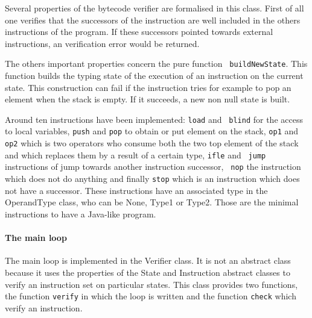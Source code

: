 Several properties of the bytecode verifier are formalised in this class.
First of all one verifies that the successors of the instruction are well included in the others instructions of the program. 
If these successors pointed towards external instructions, an verification error would be returned. 

The others important properties concern the pure function {\tt
buildNewState}.  This function builds the typing state of the
execution of an instruction on the current state.  This construction
can fail if the instruction tries for example to pop an element when
the stack is empty.  If it succeeds, a new non null state is built.


Around ten instructions have been implemented: {\tt load} and {\tt
blind} for the access to local variables, {\tt push} and {\tt pop} to
obtain or put element on the stack, {\tt op1} and {\tt op2} which is
two operators who consume both the two top element of the stack and
which replaces them by a result of a certain type, {\tt ifle} and {\tt
jump} instructions of jump towards another instruction successor, {\tt
nop} the instruction which does not do anything and finally {\tt stop}
which is an instruction which does not have a successor.  These
instructions have an associated type in the OperandType class, who can
be None, Type1 or Type2.  Those are the minimal instructions to have a
Java-like program.

\paragraph {The main loop}
The main loop is implemented in the Verifier class.  It is not an
abstract class because it uses the properties of the State and
Instruction abstract classes to verify an instruction set on
particular states.  This class provides two functions, the function
{\tt verify} in which the loop is written and the function {\tt check}
which verify an instruction.


